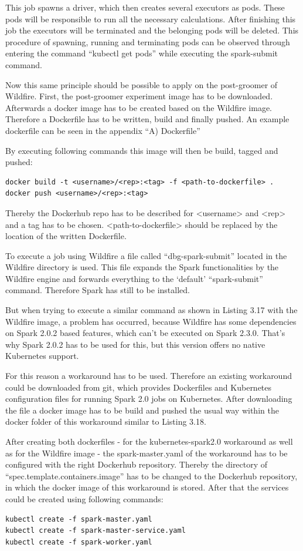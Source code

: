 This job spawns a driver, which then creates several executors as pods. These pods will be responsible to run all the necessary calculations. After finishing this job the executors will be terminated and the belonging pods will be deleted. This procedure of spawning, running and terminating pods can be observed through entering the command ``kubectl get pods'' while executing the spark-submit command.

Now this same principle should be possible to apply on the post-groomer of Wildfire. First, the post-groomer experiment image has to be downloaded. Afterwards a docker image has to be created based on the Wildfire image. Therefore a Dockerfile has to be written, build and finally pushed. An example dockerfile can be seen in the appendix ``A) Dockerfile''

By executing following commands this image will then be build, tagged and pushed:
\begin{lstlisting}[caption={Build Wildfire docker image},captionpos=b]
docker build -t <username>/<rep>:<tag> -f <path-to-dockerfile> .
docker push <username>/<rep>:<tag>
\end{lstlisting}
Thereby the Dockerhub repo has to be described for <username> and <rep> and a tag has to be chosen. <path-to-dockerfile> should be replaced by the location of the written Dockerfile.

To execute a job using Wildfire a file called ``dbg-spark-submit'' located in the Wildfire directory is used. This file expands the Spark functionalities by the Wildfire engine and forwards everything to the `default' ``spark-submit'' command. Therefore Spark has still to be installed.

But when trying to execute a similar command as shown in Listing 3.17 with the Wildfire image, a problem has occurred, because Wildfire has some dependencies on Spark 2.0.2 based features, which can't be executed on Spark 2.3.0. That's why Spark 2.0.2 has to be used for this, but this version offers no native Kubernetes support.

For this reason a workaround has to be used. Therefore an existing workaround could be downloaded from git, which provides Dockerfiles and Kubernetes configuration files for running Spark 2.0 jobs on Kubernetes. After downloading the file a docker image has to be build and pushed the usual way within the docker folder of this workaround similar to Listing 3.18.

After creating both dockerfiles - for the kubernetes-spark2.0 workaround as well as for the Wildfire image - the spark-master.yaml of the workaround has to be configured with the right Dockerhub repository. Thereby the directory of ``spec.template.containers.image'' has to be changed to the Dockerhub repository, in which the docker image of this workaround is stored. After that the services could be created using following commands:
\begin{lstlisting}[caption={Create Spark 2.0 services on Kubernetes},captionpos=b]
kubectl create -f spark-master.yaml
kubectl create -f spark-master-service.yaml
kubectl create -f spark-worker.yaml
\end{lstlisting}

